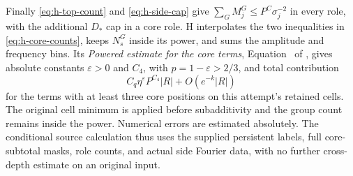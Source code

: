 Finally \eqref{eq:h-top-count} and \eqref{eq:h-side-cap} give
\(\sum_GM_j^G\le P^C\sigma_j^{-2}\) in every role, with the
additional \(D_*\) cap in a core role.  H interpolates the two
inequalities in \eqref{eq:h-core-counts}, keeps \(N_s^G\)
inside its power, and sums the amplitude and frequency bins.
Its \emph{Powered estimate for the core terms},
Equation~ of \cite[Section~9]{H}, gives absolute
constants \(\varepsilon>0\) and \(C_4\), with
\(p=1-\varepsilon>2/3\), and total contribution
\begin{equation}
 C_q\eta^\varepsilon P^{C_4}|R|+O(e^{-k}|R|)
 \label{eq:h-core-estimate}
\end{equation}
for the terms with at least three core positions on this
attempt's retained cells.  The original cell minimum is applied
before subadditivity and the group count remains inside the
power.  Numerical errors are estimated absolutely.  The
conditional source calculation thus uses the supplied persistent
labels, full core-subtotal masks, role counts, and actual side
Fourier data, with no further cross-depth estimate on an
original input.
